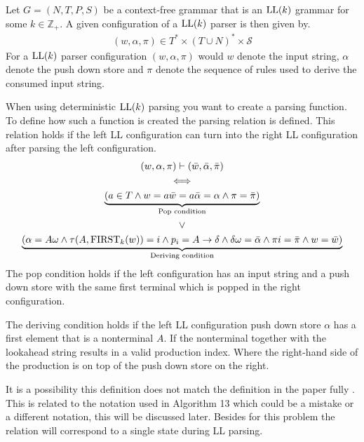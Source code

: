 \begin{definition}
    \label{def:ll-configuration}
    Let $G = (N, T, P, S)$ be a context-free grammar that is an $\text{LL}(k)$ grammar for some $k \in \mathbb{Z}_+$. A given configuration \cite[p. 5]{Vagner2007} of a $\text{LL}(k)$ parser is then given by.
    \begin{align*}
        (w, \alpha, \pi) \in T^* \times (T \cup N)^* \times \mathcal{S}
    \end{align*}
    For a $\text{LL}(k)$ parser configuration $(w, \alpha, \pi)$ would $w$ denote the input string, $\alpha$ denote the push down store and $\pi$ denote the sequence of rules used to derive the consumed input string.
\end{definition}
\noindent When using deterministic $\text{LL}(k)$ parsing you want to create a parsing function. To define how such a function is created the parsing relation is defined. This relation holds if the left LL configuration can turn into the right LL configuration after parsing the left configuration.
\begin{gather*}
    (w, \alpha, \pi) \vdash (\bar{w}, \bar{\alpha}, \bar{\pi}) \\
    \iff \\
    \underbrace{(a \in T \land w = a\bar{w} = a\bar{\alpha} = \alpha \land \pi = \bar{\pi})}_{\text{Pop condition}} \\
    \lor \\
    \underbrace{\left(\alpha = A\omega \land \tau(A, \text{FIRST}_k(w)) = i \land p_i = A \to \delta \land \delta\omega = \bar{\alpha} \land \pi i = \bar{\pi} \land w = \bar{w}\right)}_{\text{Deriving condition}}
\end{gather*}
The pop condition holds if the left configuration has an input string and a push down store with the same first terminal which is popped in the right configuration.

The deriving condition holds if the left LL configuration push down store $\alpha$ has a first element that is a nonterminal $A$. If the nonterminal together with the lookahead string results in a valid production index. Where the right-hand side of the production is on top of the push down store on the right.

It is a possibility this definition does not match the definition in the paper fully \cite[6]{Vagner2007}. This is related to the notation used in Algorithm 13 \cite[15]{Vagner2007} which could be a mistake or a different notation, this will be discussed later. Besides for this problem the relation will correspond to a single state during LL parsing.

